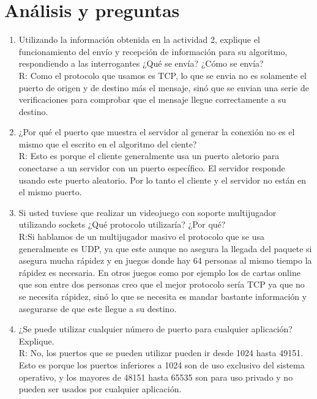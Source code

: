 \documentclass[onecolumn,11pts]{IEEEtran}
\begin{document}
\section{Análisis y preguntas}
\begin{enumerate}
\item Utilizando la información obtenida en la actividad 2, explique el funcionamiento del envío y recepción
de información para su algoritmo, respondiendo a las interrogantes ¿Qué se envía? ¿Cómo se envía?\\
R: Como el protocolo que usamos es TCP, lo que se envia no es solamente el puerto de origen y de destino más el mensaje, sinó que se envian una serie de verificaciones para comprobar que el mensaje llegue correctamente a su destino.
\item ¿Por qué el puerto que muestra el servidor al generar la conexión no es el mismo que el escrito en el
algoritmo del ciente?\\
R: Esto es porque el cliente generalmente usa un puerto aletorio para conectarse a un servidor con un puerto específico. El servidor responde usando este puerto aleatorio. Por lo tanto el cliente y el servidor no están en el mismo puerto.

\item Si usted tuviese que realizar un videojuego con soporte multijugador utilizando sockets ¿Qué protocolo
utilizaría? ¿Por qué?\\
R:Si hablamos de un multijugador masivo el protocolo que se usa generalmente es UDP, ya que este aunque no asegura la llegada del paquete si asegura mucha rápidez y en juegos donde hay 64 personas al mismo tiempo la rápidez es necesaria. En otros juegos como por ejemplo los de cartas online que son entre dos personas creo que el mejor protocolo sería TCP ya que no se necesita rápidez, sinó lo que se necesita es mandar bastante información y asegurarse de que este llegue a su destino.
\item ¿Se puede utilizar cualquier número de puerto para cualquier aplicación? Explique.\\
R: No, los puertos que se pueden utilizar pueden ir desde 1024 hasta 49151. Esto es porque los puertos inferiores a 1024 son de uso exclusivo del sistema operativo, y los mayores de 48151 hasta 65535 son para uso privado y no pueden ser usados por cualquier aplicación.

\end{enumerate}
\newpage
\end{document}
